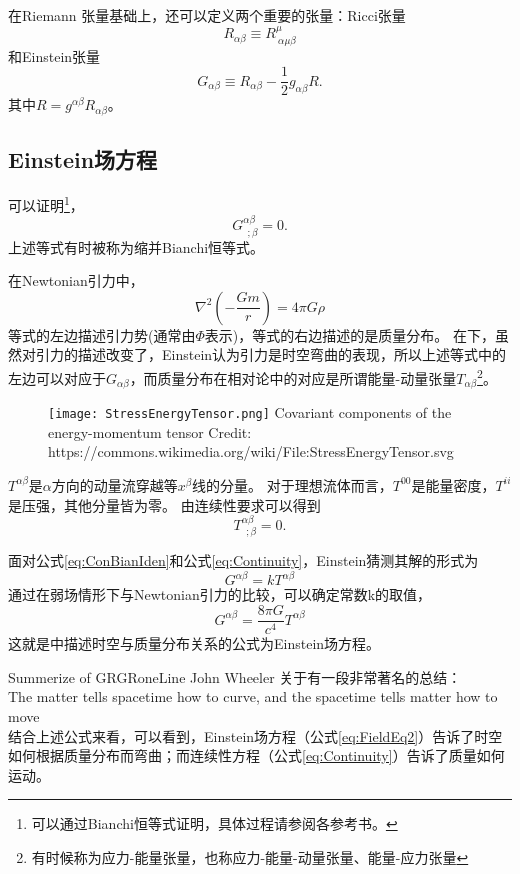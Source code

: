 在Riemann 张量基础上，还可以定义两个重要的张量：Ricci张量
\begin{equation}\label{eq:RicciTensor}
  R_{\alpha\beta} \equiv R^\mu_{~\alpha\mu\beta}
\end{equation}
和Einstein张量
\begin{equation}\label{eq:EinsteinTensor}
  G_{\alpha\beta} \equiv R_{\alpha\beta} -\frac{1}{2}g_{\alpha\beta}R.
\end{equation}
其中$R =g^{\alpha\beta}R_{\alpha\beta}$。

\subsection{Einstein场方程}

可以证明\footnote{可以通过Bianchi恒等式证明，具体过程请参阅各参考书。}，
\begin{equation}\label{eq:ConBianIden}
  G^{\alpha\beta}_{~~;\beta} =0.
\end{equation}
上述等式有时被称为缩并Bianchi恒等式。

在Newtonian引力中，
\begin{equation}\label{eq:NewtonPoisson}
  \nabla ^2 \left(-\frac{Gm}{r}\right) = 4\pi G \rho
\end{equation}
等式的左边描述引力势(通常由$\Phi$表示)，等式的右边描述的是质量分布。
在\GR 下，虽然对引力的描述改变了，Einstein认为引力是时空弯曲的表现，所以上述等式中的左边可以对应于$G_{\alpha\beta}$，而质量分布在相对论中的对应是所谓能量-动量张量$T_{\alpha\beta}$\footnote{有时候称为应力-能量张量，也称应力-能量-动量张量、能量-应力张量}。
\begin{figure}[htp]
\centering
\texttt{[image: StressEnergyTensor.png]}
  {Covariant components of the energy-momentum tensor Credit: https://commons.wikimedia.org/wiki/File:StressEnergyTensor.svg}
\label{fig:ModGrav}
\end{figure}
$T^{\alpha\beta}$是$\alpha$方向的动量流穿越等$x^\beta$线的分量。
对于理想流体而言，$T^{00}$是能量密度，$T^{ii}$是压强，其他分量皆为零。
由连续性要求可以得到
\begin{equation}\label{eq:Continuity}
  T^{\alpha\beta}_{~~;\beta} =0.
\end{equation}
 
面对公式\ref{eq:ConBianIden}和公式\ref{eq:Continuity}，Einstein猜测其解的形式为
\begin{equation}\label{eq:FieldEq1}
  G^{\alpha\beta} =kT^{\alpha\beta}
\end{equation}
通过在弱场情形下与Newtonian引力的比较，可以确定常数k的取值，
\begin{equation}\label{eq:FieldEq2}
  G^{\alpha\beta} =\frac{8\pi G}{c^4}T^{\alpha\beta}
\end{equation}
这就是\GR 中描述时空与质量分布关系的公式为Einstein场方程。

\begin{myprop}{Summerize of GR}{GRoneLine}
John Wheeler 关于\GR 有一段非常著名的总结：\\
The matter tells spacetime how to curve, and the spacetime tells matter how to move\\
  结合上述公式来看，可以看到，Einstein场方程（公式\ref{eq:FieldEq2}）告诉了时空如何根据质量分布而弯曲；而连续性方程（公式\ref{eq:Continuity}）告诉了质量如何运动。
\end{myprop}
